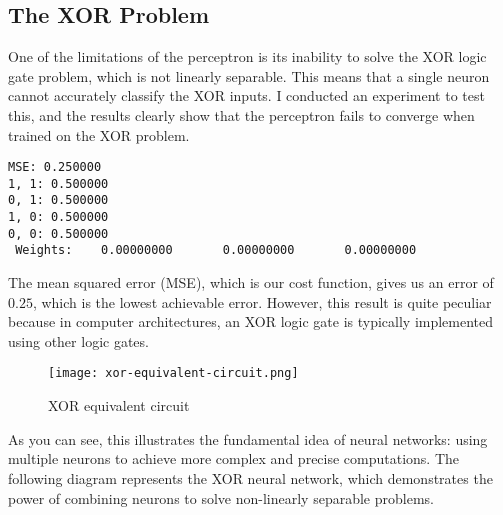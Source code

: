 \subsection{The XOR Problem}
One of the limitations of the perceptron is its inability to solve the XOR logic gate problem, which is
not linearly separable. This means that a single neuron cannot accurately classify the XOR inputs.
I conducted an experiment to test this, and the results clearly show that the perceptron fails to converge
when trained on the XOR problem.
\begin{verbatim}
MSE: 0.250000
1, 1: 0.500000
0, 1: 0.500000
1, 0: 0.500000
0, 0: 0.500000
 Weights:    0.00000000       0.00000000       0.00000000    
\end{verbatim}
The mean squared error (MSE), which is our cost function, gives us an error of $0.25$, which is the lowest
achievable error. However, this result is quite peculiar because in computer architectures, an XOR logic
gate is typically implemented using other logic gates.
\begin{figure}[H]
  \centering
  \texttt{[image: xor-equivalent-circuit.png]}
  \caption{XOR equivalent circuit}
\end{figure}
As you can see, this illustrates the fundamental idea of neural networks: using multiple neurons to achieve
more complex and precise computations. The following diagram represents the XOR neural network,
which demonstrates the
power of combining neurons to solve non-linearly separable problems.


\begin{center}
\end{center}

